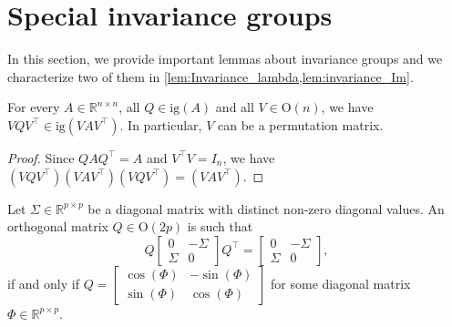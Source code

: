 \documentclass[10pt,twoside,dvipsnames]{siamart1116}
\numberwithin{algorithm}{section}
\numberwithin{equation}{section}
\begin{document}
\section{Special invariance groups}\label{sec:similarities} In this section, we provide important lemmas about invariance groups and we characterize two of them in \cref{lem:Invariance_lambda,lem:invariance_Im}.
\begin{lemma}\label{lem:permute}

	For every $A\in\mathbb{R}^{n\times n}$, all $Q\in\mathrm{ig}(A)$ and all $V\in\mathrm{O}(n)$, we have $VQV^\top \in\mathrm{ig}(VAV^\top )$. In particular, $V$ can be a permutation matrix.
	\end{lemma}
	\begin{proof}
	Since $QAQ^\top =A$ and $V^\top V=I_n$, we have $(VQV^\top )(VAV^\top )(VQV^\top )=(VAV^\top )$.
	\end{proof}
	\begin{lemma}
	\label{lem:Invariance_lambda}
		Let $\Sigma\in\mathbb{R}^{p\times p}$ be a diagonal matrix with distinct non-zero diagonal values. An orthogonal matrix $Q\in\mathrm{O}(2p)$ is such that
		\begin{equation}\label{eq:invariance_sigma}
			Q\begin{bmatrix}
			0&-\Sigma\\
			\Sigma& 0
			\end{bmatrix}Q^\top  = \begin{bmatrix}
			0&-\Sigma\\
			\Sigma& 0
			\end{bmatrix},
		\end{equation}
		if and only if $Q = \begin{bmatrix}
		\cos(\Phi)&-\sin(\Phi)\\
		\sin(\Phi)&\cos(\Phi)
		\end{bmatrix}$ for some diagonal matrix $\Phi\in\mathbb{R}^{p\times p}$.
	\end{lemma}
\end{document}

